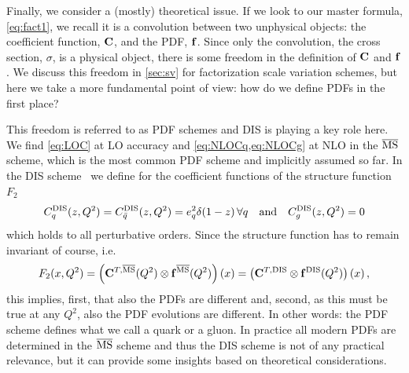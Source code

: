 Finally, we consider a (mostly) theoretical issue.
If we look to our master formula, \cref{eq:fact1}, we recall it is a convolution between two unphysical objects: the coefficient function, $\vb C$, and the PDF, $\vb f$.
Since only the convolution, the cross section, $\sigma$, is a physical object, there is some freedom in the definition of $\vb C$ and $\vb f$.
We discuss this freedom in \cref{sec:sv} for factorization scale variation schemes, but here we take a more fundamental point of view: how do we define PDFs in the first place?

This freedom is referred to as PDF schemes and DIS is playing a key role here.
We find \cref{eq:LOC} at LO accuracy and \cref{eq:NLOCq,eq:NLOCg} at NLO in the $\overline{\mathrm{MS}}$ scheme, which is the most common PDF scheme and implicitly assumed so far.
In the DIS scheme~\cite{Diemoz:1987xu} we define for the coefficient functions of the structure function $F_2$
\begin{equation}
    C_q^{\mathrm{DIS}}(z,Q^2) = C_{\bar q}^{\mathrm{DIS}}(z,Q^2) = e_q^2 \delta(1-z)\,\forall q \qq{and} C_g^{\mathrm{DIS}}(z,Q^2) = 0 \label{eq:CDIS}
\end{equation}
which holds to all perturbative orders.
Since the structure function has to remain invariant of course, i.e.\
\begin{equation}
    F_2(x,Q^2) = \left(\vb C^{T,\overline{\mathrm{MS}}}(Q^2) \otimes \vb f^{\overline{\mathrm{MS}}}(Q^2) \right)(x)
        = \left(\vb C^{T,\mathrm{DIS}} \otimes \vb f^{\mathrm{DIS}}(Q^2) \right)(x)\,, \label{eq:F2DIS}
\end{equation}
this implies, first, that also the PDFs are different and, second, as this must be true at any $Q^2$, also the PDF evolutions are different.
In other words: the PDF scheme defines what we call a quark or a gluon.
In practice all modern PDFs are determined in the $\overline{\mathrm{MS}}$ scheme and thus the DIS scheme is not of any practical relevance, but it can provide some insights based on theoretical considerations.

